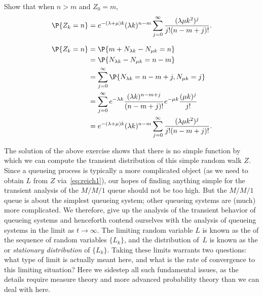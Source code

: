 \begin{exercise}
 Show that when $n>m$ and $Z_0=m$, 
\begin{equation*}
 \P{Z_k=n}
= e^{-(\lambda+\mu)k} (\lambda k)^{n-m} \sum_{j=0}^\infty 
\frac{(\lambda\mu k^2)^j} {j!(n-m+j)!}.
\end{equation*}
\begin{solution}
\begin{equation}\label{eq:29}
 \begin{split}
 \P{Z_k=n}
&= \P{m+N_{\lambda k } - N_{\mu k} = n } \\ 
&= \P{N_{\lambda k}  - N_{\mu k}  = n - m } \\
&= \sum_{j=0}^\infty \P{N_{\lambda k}  =  n - m + j, N_{\mu k} =j}\\
&= \sum_{j=0}^\infty e^{-\lambda k} \frac{(\lambda k )^{n - m + j}}{(n-m+j)!} e^{-\mu k} \frac{(\mu k )^j}{j!} \\
&= e^{-(\lambda+\mu)k} (\lambda k)^{n-m} \sum_{j=0}^\infty  \frac{(\lambda\mu k^2)^j} {j!(n-m+j)!}.
 \end{split}
\end{equation}
\end{solution}
\end{exercise}


The solution of the above exercise shows that there is no simple function by which we can compute the transient distribution of this simple random walk $Z$.
Since a queueing process is typically a more complicated object (as we need to obtain $L$ from $Z$ via~\cref{eq:reich1}), our hopes of finding anything simple for the transient analysis of the $M/M/1$ queue should not be too high.
But the $M/M/1$ queue is about the simplest queueing system; other queueing systems are (much) more complicated.
We therefore, give up the analysis of the transient behavior of queueing systems and henceforth contend ourselves with the analysis of queueing systems in the limit as $t\to\infty$.
The limiting random variable $L$ is known as the  of the sequence of random variables $\{L_k\}$, and the distribution of~$L$ is known as the  or \emph{stationary distribution} of $\{L_k\}$.
Taking these limits warrants two questions: what type of limit is actually meant here, and what is the rate of convergence to this limiting situation?
Here we sidestep all such fundamental issues, as the details require measure theory and more advanced probability theory than we can deal with here.


